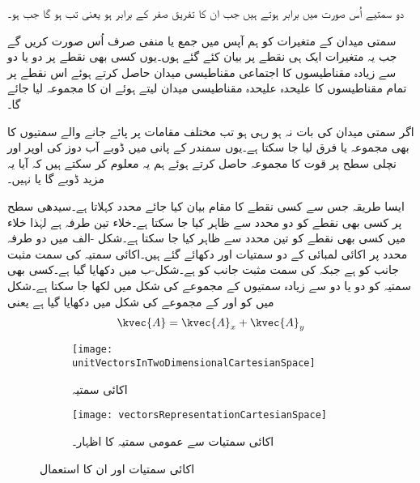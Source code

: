 دو سمتیے اُس صورت میں برابر ہوتے ہیں جب ان کا تفریق صفر کے برابر ہو یعنی  تب ہو گا جب  ہو۔

سمتی میدان کے متغیرات کو ہم آپس میں جمع یا منفی صرف اُس صورت کریں گے جب یہ متغیرات ایک ہی نقطے پر بیان کئے گئے ہوں۔یوں کسی بھی نقطے پر دو یا دو سے زیادہ مقناطیسوں کا اجتماعی مقناطیسی میدان حاصل کرتے ہوئے اس نقطے پر تمام مقناطیسوں کا علیحدہ علیحدہ مقناطیسی میدان لیتے ہوئے ان کا مجموعہ لیا جائے گا۔

اگر سمتی میدان کی بات نہ ہو رہی ہو تب مختلف مقامات پر پائے جانے والے سمتیوں کا بھی مجموعہ یا فرق لیا جا سکتا ہے۔یوں سمندر کے پانی میں ڈوبے  آب دوز کی اوپر اور نچلی سطح پر قوت کا مجموعہ حاصل کرتے ہوئے ہم یہ معلوم کر سکتے ہیں کہ آیا یہ مزید ڈوبے گا یا نہیں۔  

ایسا طریقہ جس سے کسی نقطے کا مقام بیان کیا جائے محدد کہلاتا ہے۔سیدھی سطح پر کسی بھی نقطے کو دو محدد سے ظاہر کیا جا سکتا ہے۔خلاء تین طرفہ ہے لہٰذا خلاء میں کسی بھی نقطے کو تین محدد سے ظاہر کیا جا سکتا ہے۔شکل -الف میں دو طرفہ   محدد پر اکائی لمبائی کے دو سمتیات  اور  دکھائے گئے ہیں۔اکائی سمتیہ  کی سمت مثبت  جانب کو ہے جبکہ   کی سمت مثبت  جانب کو ہے۔شکل-ب میں  دکھایا گیا ہے۔کسی بھی سمتیہ کو دو یا دو سے زیادہ سمتیوں کے مجموعے کی شکل میں لکھا جا سکتا ہے۔شکل میں  کو  اور  کے مجموعے کی شکل میں دکھایا گیا ہے یعنی
\begin{align}
\kvec{A}=\kvec{A}_x+\kvec{A}_y
\end{align}

\begin{figure}
\begin{subfigure}{0.5\textwidth}
\centering
\texttt{[image: unitVectorsInTwoDimensionalCartesianSpace]}
\caption{اکائی سمتیہ}
\end{subfigure}
%
\begin{subfigure}{0.5\textwidth}
\centering
\texttt{[image: vectorsRepresentationCartesianSpace]}
\caption{اکائی سمتیات سے عمومی سمتیہ کا اظہار۔}
\end{subfigure}
\caption{اکائی سمتیات اور ان کا استعمال}
\label{شکل_سمتیہ_اکائی_سے_سمتیہ_کا_اظہار}
\end{figure}
%



